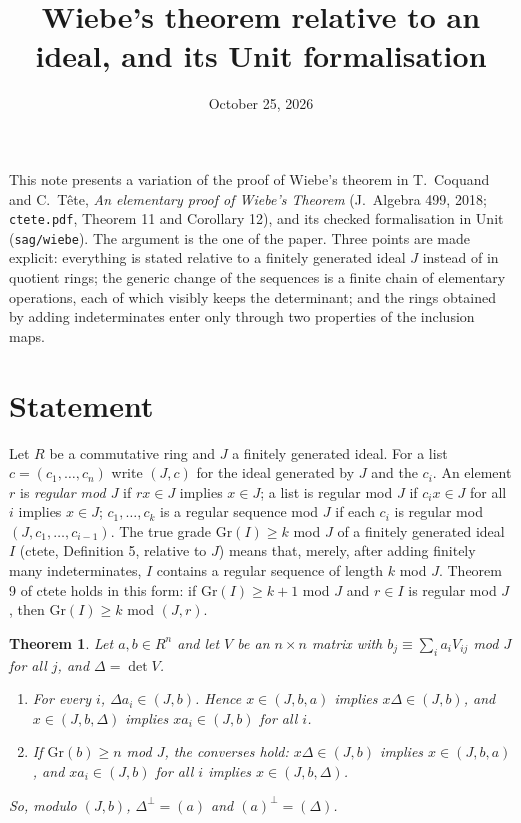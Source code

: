 \documentclass[11pt]{amsart}
\title{Wiebe's theorem relative to an ideal, and its Unit formalisation}
\date{October 25, 2026}
\newtheorem{theorem}{Theorem}
\theoremstyle{remark}
\newcommand{\code}[1]{\texttt{#1}}
\newcommand{\Gr}{\mathrm{Gr}}
\begin{document}
\maketitle

This note presents a variation of the proof of Wiebe's theorem in
T.~Coquand and C.~T\^ete, \emph{An elementary proof of Wiebe's Theorem}
(J.~Algebra 499, 2018; \code{ctete.pdf}, Theorem 11 and Corollary 12), and
its checked formalisation in Unit (\code{sag/wiebe}).  The argument is
the one of the paper.  Three points are made explicit: everything is
stated relative to a finitely generated ideal $J$ instead of in quotient
rings; the generic change of the sequences is a finite chain of
elementary operations, each of which visibly keeps the determinant; and
the rings obtained by adding indeterminates enter only through two
properties of the inclusion maps.

\section{Statement}

Let $R$ be a commutative ring and $J$ a finitely generated ideal.  For a
list $c=(c_1,\dots,c_n)$ write $(J,c)$ for the ideal generated by $J$
and the $c_i$.  An element $r$ is \emph{regular mod $J$} if $rx\in J$
implies $x\in J$; a list is regular mod $J$ if $c_ix\in J$ for all $i$
implies $x\in J$; $c_1,\dots,c_k$ is a regular sequence mod $J$ if each
$c_i$ is regular mod $(J,c_1,\dots,c_{i-1})$.  The true grade
$\Gr(I)\geq k$ mod $J$ of a finitely generated ideal $I$ (ctete,
Definition 5, relative to $J$) means that, merely, after adding finitely
many indeterminates, $I$ contains a regular sequence of length $k$
mod $J$.  Theorem 9 of ctete holds in this form: if $\Gr(I)\geq k+1$
mod $J$ and $r\in I$ is regular mod $J$, then $\Gr(I)\geq k$ mod $(J,r)$.

\begin{theorem}\label{thm:wiebe}
Let $a,b\in R^n$ and let $V$ be an $n\times n$ matrix with
$b_j\equiv\sum_i a_iV_{ij}$ mod $J$ for all $j$, and $\Delta=\det V$.
\begin{enumerate}
\item For every $i$, $\Delta a_i\in(J,b)$.  Hence $x\in(J,b,a)$ implies
  $x\Delta\in(J,b)$, and $x\in(J,b,\Delta)$ implies $xa_i\in(J,b)$ for
  all $i$.
\item If $\Gr(b)\geq n$ mod $J$, the converses hold: $x\Delta\in(J,b)$
  implies $x\in(J,b,a)$, and $xa_i\in(J,b)$ for all $i$ implies
  $x\in(J,b,\Delta)$.
\end{enumerate}
So, modulo $(J,b)$, $\Delta^\perp=(a)$ and $(a)^\perp=(\Delta)$.
\end{theorem}
\end{document}
